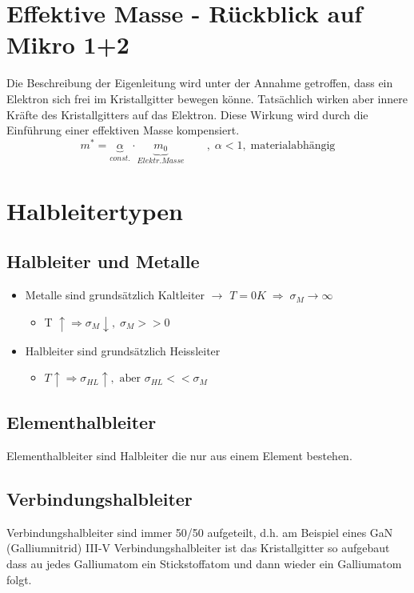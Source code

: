 \section{Effektive Masse - Rückblick auf Mikro 1+2}
Die Beschreibung der Eigenleitung wird unter der Annahme getroffen, dass ein Elektron sich frei im Kristallgitter bewegen könne. Tatsächlich wirken aber innere Kräfte des Kristallgitters auf das Elektron. Diese Wirkung wird durch die Einführung einer effektiven Masse kompensiert.
	\begin{equation}
		m^* = \underbrace{\alpha}_{const.} \cdot \underbrace{m_0}_{Elektr. Masse} \qquad ,\; \alpha < 1,\; \text{materialabhängig}
	\end{equation}

\section{Halbleitertypen}
	\subsection{Halbleiter und Metalle}
	\begin{itemize}
		\item Metalle sind grundsätzlich Kaltleiter $\rightarrow$ $T=0K \; \Rightarrow \; \sigma_M \rightarrow \infty$
		\begin{itemize}
			\item T $\uparrow \Rightarrow \sigma_M \downarrow, \; \sigma_M >>0$
		\end{itemize}
		\item Halbleiter sind grundsätzlich Heissleiter
		\begin{itemize}
			\item $T\uparrow \Rightarrow \sigma_{HL} \uparrow, \text{ aber } \sigma_{HL} << \sigma_M$
		\end{itemize}
	\end{itemize}
	
	\subsection{Elementhalbleiter} \label{ss_hltyp_ehl}
	Elementhalbleiter sind Halbleiter die nur aus einem Element bestehen.
	\subsection{Verbindungshalbleiter} \label{ss_hltyp_vhl}
	Verbindungshalbleiter sind immer 50/50 aufgeteilt, d.h. am Beispiel eines GaN (Galliumnitrid) III-V Verbindungshalbleiter ist das Kristallgitter so aufgebaut dass au jedes Galliumatom ein Stickstoffatom und dann wieder ein Galliumatom folgt. 
